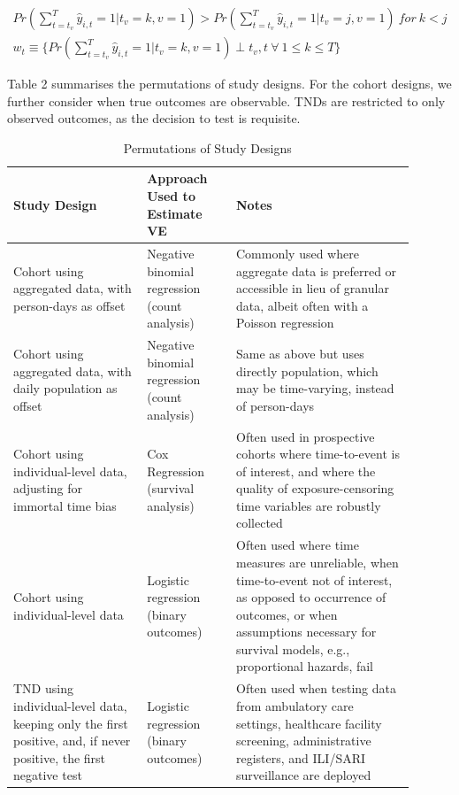 \documentclass[12pt]{article}
\begin{document}
\begin{eqnarray}
	Pr(\sum_{t=t_v}^{T}\hat{y}_{i,t}=1 | t_v = k, v = 1) > Pr(\sum_{t=t_v}^{T}\hat{y}_{i,t}=1 | t_v = j, v = 1) \ for \ k < j \\
	w_t \equiv \{ Pr(\sum_{t=t_v}^{T}\hat{y}_{i,t}=1 | t_v = k, v = 1) \perp t_v, t \ \forall \ 1 \leq k \leq T \}
\end{eqnarray}

Table 2 summarises the permutations of study designs. For the cohort designs, we further consider when true outcomes are observable. TNDs are restricted to only observed outcomes, as the decision to test is requisite.

\begin{table}[H]
	\begin{center}
		\caption{Permutations of Study Designs}
		\begin{tabular}{||p{0.3\linewidth}|p{0.2\linewidth}| p{0.4\linewidth}||}
			\hline \hline
			\textbf{Study Design} & \textbf{Approach Used to Estimate VE} & \textbf{Notes} \\
			\hline \hline
			Cohort using aggregated data, with person-days as offset & Negative binomial regression (count analysis) & Commonly used where aggregate data is preferred or accessible in lieu of granular data, albeit often with a Poisson regression \citep{bar2021protection, goldberg2021waning, suah2022waning} \\ 
			\hline
			Cohort using aggregated data, with daily population as offset & Negative binomial regression (count analysis) & Same as above but uses directly population, which may be time-varying, instead of person-days \\ 
			\hline
			Cohort using individual-level data, adjusting for immortal time bias & Cox Regression (survival analysis) & Often used in prospective cohorts where time-to-event is of interest, and where the quality of exposure-censoring time variables are robustly collected \citep{jara2021effectiveness, jaraeffectiveness} \\ 
			\hline
			Cohort using individual-level data & Logistic regression (binary outcomes) & Often used where time measures are unreliable, when time-to-event not of interest, as opposed to occurrence of outcomes, or when assumptions necessary for survival models, e.g., proportional hazards, fail \citep{suah2022waning, suah2021pick} \\ 
			\hline
			TND using individual-level data, keeping only the first positive, and, if never positive, the first negative test & Logistic regression (binary outcomes) & Often used when testing data from ambulatory care settings, healthcare facility screening, administrative registers, and ILI/SARI surveillance are deployed \citep{olson2022effectiveness} \\ 

\end{tabular}
\end{center}
\end{table}
\end{document}

